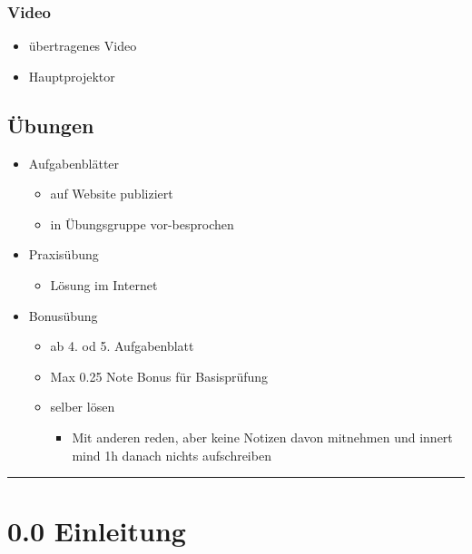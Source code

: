 \documentclass[11pt]{article}
\begin{document}
\subsubsection{Video}
\label{sec:org46d9731}
\begin{itemize}
\item übertragenes Video\\
\item Hauptprojektor\\
\end{itemize}

\subsection{Übungen}
\label{sec:org6ca0275}
\begin{itemize}
\item Aufgabenblätter\\
\begin{itemize}
\item auf Website publiziert\\
\item in Übungsgruppe vor-besprochen\\
\end{itemize}
\item Praxisübung\\
\begin{itemize}
\item Lösung im Internet\\
\end{itemize}
\item Bonusübung\\
\begin{itemize}
\item ab 4. od 5. Aufgabenblatt\\
\item Max 0.25 Note Bonus für Basisprüfung\\
\item selber lösen\\
\begin{itemize}
\item Mit anderen reden, aber keine Notizen davon mitnehmen und innert mind 1h danach nichts aufschreiben\\
\end{itemize}
\end{itemize}
\end{itemize}

\noindent\rule{\textwidth}{0.5pt}
\section{0.0 Einleitung}
\label{sec:org4723959}
\end{document}
